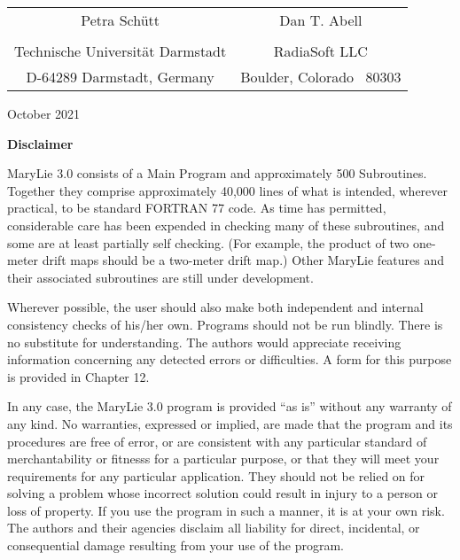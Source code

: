 \begin{titlepage}
\begin{center}
\begin{tabular}{cc}
{\large Petra Sch\"{u}tt}             & {\large Dan T. Abell}\\
\vspace{-2mm}\\
Technische Universit\"{a}t Darmstadt  & RadiaSoft LLC\\
D-64289 Darmstadt, Germany            & Boulder, Colorado \ 80303\\

\end{tabular}

\vspace{10mm}
{\large October 2021}
\end{center}
\end{titlepage}

{\small
\centerline{\bf Disclaimer}
MaryLie 3.0 consists of a Main Program and approximately 500 Subroutines.
Together they comprise approximately 40,000 lines of what is intended,
wherever practical, to be standard FORTRAN 77 code.  As time has
permitted, considerable care has been expended in checking many of these
subroutines, and some are at least partially self checking.  (For
example, the product of two one-meter drift maps should be a two-meter
drift map.)  Other MaryLie features and their associated subroutines are
still under development.

Wherever possible, the user should also make both independent and
internal consistency checks of his/her own.  Programs should not be run
blindly.  There is no substitute for understanding.  The authors would
appreciate receiving information concerning any detected errors or
difficulties.  A form for this purpose is provided in Chapter 12.

In any case, the MaryLie 3.0 program is provided ``as is'' without any
warranty of any kind.  No warranties, expressed or implied, are made
that the program and its procedures are free of error, or are consistent
with any particular standard of merchantability or fitnesss for a
particular purpose, or that they will meet
your requirements for any particular application.  They should not be
relied on for solving a problem whose incorrect solution could result in
injury to a person or loss of property.  If you use the program in such
a manner, it is at your own risk.  The authors and their agencies
disclaim all liability for direct, incidental, or consequential damage
resulting from your use of the program.

}
